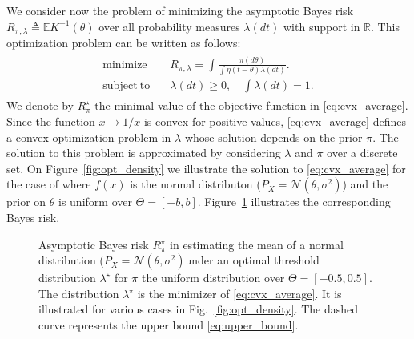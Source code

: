 \documentclass[letterpaper, 11pt]{IEEEtran}      %
\newcommand{\Ncal}{\mathcal{N}}
\begin{document}
 We consider now the problem of minimizing the asymptotic Bayes risk $
R_{\pi,\lambda} \triangleq \mathbb E  K^{-1}(\theta)$ over all probability measures $\lambda(dt)$ with support in $\mathbb R$. This optimization problem can be written as follows:
\begin{align}
\label{eq:cvx_average}
\begin{split}
\mathrm{minimize} \quad & R_{\pi,\lambda} =  \int \frac{\pi(d\theta)}{ \int \eta \left( t-\theta\right) \lambda(dt)}. \\ 
\mathrm{subject~to} \quad & \lambda(dt)\geq 0,\quad \int \lambda(dt) =1. 
\end{split}
\end{align}
We denote by $R^\star_{\pi}$ the minimal value of the objective function in \eqref{eq:cvx_average}. Since the function $x \rightarrow 1/x$ is convex for positive values, \eqref{eq:cvx_average} defines a convex optimization problem in $\lambda$ whose solution depends on the prior $\pi$. The solution to this problem is approximated by considering $\lambda$ and $\pi$ over a discrete set. On Figure~\ref{fig:opt_density} we illustrate the solution to \eqref{eq:cvx_average} for the case of where $f(x)$ is the normal distributon ($P_X = \Ncal(\theta, \sigma^2)$) and the prior on $\theta$ is uniform over $\Theta = [-b,b]$. Figure~\ref{fig:dist_bound_uniform} illustrates the corresponding Bayes risk. 
\par
\begin{figure}
\begin{center}

\caption{Asymptotic Bayes risk $R_{\pi}^\star$ in estimating the mean of a normal distribution ($P_X = \Ncal(\theta, \sigma^2)$under an optimal threshold distribution $\lambda^\star$ for $\pi$ the uniform distribution over $\Theta = [-0.5,0.5]$. 
%
The distribution $\lambda^\star$ is the minimizer of \eqref{eq:cvx_average}. It is illustrated for various cases in Fig.~\ref{fig:opt_density}. The dashed curve represents the upper bound \eqref{eq:upper_bound}. 
\label{fig:dist_bound_uniform}  }
\end{center}
\end{figure}
\end{document}
